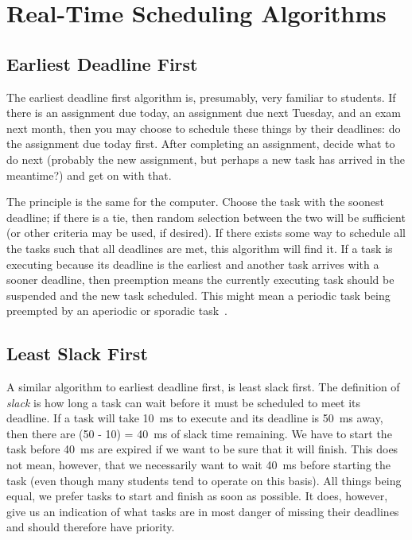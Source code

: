 




\section*{Real-Time Scheduling Algorithms}









\subsection*{Earliest Deadline First}

The earliest deadline first algorithm is, presumably, very familiar to students. If there is an assignment due today, an assignment due next Tuesday, and an exam next month, then you may choose to schedule these things by their deadlines: do the assignment due today first. After completing an assignment, decide what to do next (probably the new assignment, but perhaps a new task has arrived in the meantime?) and get on with that.

The principle is the same for the computer. Choose the task with the soonest deadline; if there is a tie, then random selection between the two will be sufficient (or other criteria may be used, if desired). If there exists some way to schedule all the tasks such that all deadlines are met, this algorithm will find it. If a task is executing because its deadline is the earliest and another task arrives with a sooner deadline, then preemption means the currently executing task should be suspended and the new task scheduled. This might mean a periodic task being preempted by an aperiodic or sporadic task~\cite{mte241}.

\subsection*{Least Slack First}
A similar algorithm to earliest deadline first, is least slack first. The definition of \textit{slack} is how long a task can wait before it must be scheduled to meet its deadline. If a task will take 10~ms to execute and its deadline is 50~ms away, then there are (50 - 10) = 40~ms of slack time remaining. We have to start the task before 40~ms are expired if we want to be sure that it will finish. This does not mean, however, that we necessarily want to wait 40~ms before starting the task (even though many students tend to operate on this basis). All things being equal, we prefer tasks to start and finish as soon as possible. It does, however, give us an indication of what tasks are in most danger of missing their deadlines and should therefore have priority.





